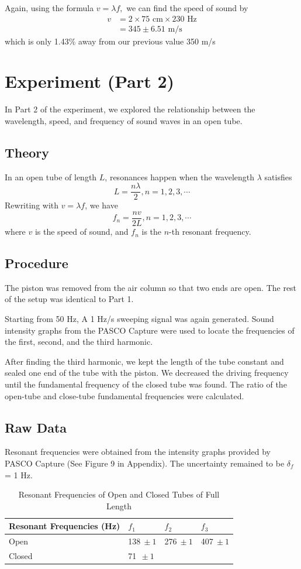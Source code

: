 Again, using the formula $v = \lambda f,$ we can find the speed of sound by
$$
\begin{aligned}
v&= 2\times75 \text{ cm}\times230\text{ Hz}\\
&= 345\pm6.51 \text{ m/s}
\end{aligned}
$$
which is only 1.43\% away from our previous value 350 m/s


\section{Experiment (Part 2)}
In Part 2 of the experiment, we explored the relationship between the wavelength, speed, and frequency of sound waves in an open tube.
\subsection{Theory}
In an open tube of length $L$, resonances happen when the wavelength $\lambda$ satisfies
$$
L = \frac{n\lambda}2, n = 1,2,3,\cdots
$$
Rewriting with $v = \lambda f$, we have
\begin{equation}
f_n = \frac{nv}{2L}, n = 1,2,3,\cdots
\end{equation}
where $v$ is the speed of sound, and $f_n$ is the $n$-th resonant frequency.
\subsection{Procedure}
The piston was removed from the air column so that two ends are open. The rest of the setup was identical to Part 1.

Starting from 50 Hz, A 1 Hz/s sweeping signal was again generated. Sound intensity graphs from the PASCO Capture were used to locate the frequencies of the first, second, and the third harmonic.

After finding the third harmonic, we kept the length of the tube constant and sealed one end of the tube with the piston. We decreased the driving frequency until the fundamental frequency of the closed tube was found. The ratio of the open-tube and close-tube fundamental frequencies were calculated.

\subsection{Raw Data}
Resonant frequencies were obtained from the intensity graphs provided by PASCO Capture (See Figure 9 in Appendix). The uncertainty remained to be $\delta_f$ = 1 Hz.
\begin{table}[h]
	\centering
	\begin{tabular}{l|lll}
		\hline
		\multicolumn{1}{c|}{Resonant Frequencies (Hz)} & $f_1$ & $f_2$ & $f_3$ \\ \hline
		Open & 138$\ \pm 1$ & 276$\ \pm 1$ & 407$\ \pm 1$ \\
		Closed & 71$\ \ \pm 1$ &  &  \\ \hline
	\end{tabular}
\caption{Resonant Frequencies of Open and Closed Tubes of Full Length}
\end{table}

